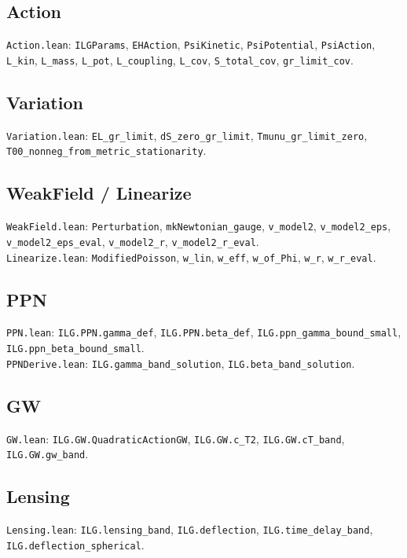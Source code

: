 \documentclass[12pt,a4paper]{article}
\begin{document}
\subsection*{Action}
\noindent\texttt{Action.lean}: \texttt{ILGParams}, \texttt{EHAction}, \texttt{PsiKinetic}, \texttt{PsiPotential}, \texttt{PsiAction}, \texttt{L\_kin}, \texttt{L\_mass}, \texttt{L\_pot}, \texttt{L\_coupling}, \texttt{L\_cov}, \texttt{S\_total\_cov}, \texttt{gr\_limit\_cov}.

\subsection*{Variation}
\noindent\texttt{Variation.lean}: \texttt{EL\_gr\_limit}, \texttt{dS\_zero\_gr\_limit}, \texttt{Tmunu\_gr\_limit\_zero}, \texttt{T00\_nonneg\_from\_metric\_stationarity}.

\subsection*{WeakField / Linearize}
\noindent\texttt{WeakField.lean}: \texttt{Perturbation}, \texttt{mkNewtonian\_gauge}, \texttt{v\_model2}, \texttt{v\_model2\_eps}, \texttt{v\_model2\_eps\_eval}, \texttt{v\_model2\_r}, \texttt{v\_model2\_r\_eval}.\\
\noindent\texttt{Linearize.lean}: \texttt{ModifiedPoisson}, \texttt{w\_lin}, \texttt{w\_eff}, \texttt{w\_of\_Phi}, \texttt{w\_r}, \texttt{w\_r\_eval}.

\subsection*{PPN}
\noindent\texttt{PPN.lean}: \texttt{ILG.PPN.gamma\_def}, \texttt{ILG.PPN.beta\_def}, \texttt{ILG.ppn\_gamma\_bound\_small}, \texttt{ILG.ppn\_beta\_bound\_small}.\\
\noindent\texttt{PPNDerive.lean}: \texttt{ILG.gamma\_band\_solution}, \texttt{ILG.beta\_band\_solution}.

\subsection*{GW}
\noindent\texttt{GW.lean}: \texttt{ILG.GW.QuadraticActionGW}, \texttt{ILG.GW.c\_T2}, \texttt{ILG.GW.cT\_band}, \texttt{ILG.GW.gw\_band}.

\subsection*{Lensing}
\noindent\texttt{Lensing.lean}: \texttt{ILG.lensing\_band}, \texttt{ILG.deflection}, \texttt{ILG.time\_delay\_band}, \texttt{ILG.deflection\_spherical}.
\end{document}
